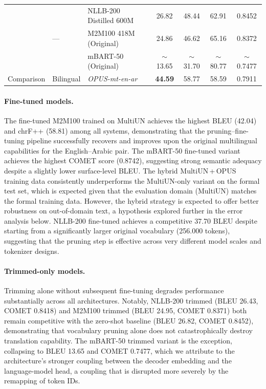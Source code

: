 \documentclass{article}
\newcommand{\best}[1]{\textbf{#1}}
\begin{document}
\begin{table}[h]
\begin{tabular}{@{} l l l
				S[table-format=2.2]
				S[table-format=2.2]
				S[table-format=2.2]
				S[table-format=1.4] @{} }
			& 
			& NLLB-200 Distilled 600M & 26.82 & 48.44 & 62.91 & 0.8452 \\
			& & M2M100 418M (Original)  & 24.86 & 46.62 & 65.16 & 0.8372 \\
			& & mBART-50 (Original)     & {$\sim$13.65} & {$\sim$31.70} & {$\sim$80.77} & {$\sim$0.7477} \\
			\midrule
			
			Comparison & Bilingual & \textit{OPUS-mt-en-ar} & {\best{44.59}} & 58.77 & 58.59 & 0.7911 \\
			\bottomrule
		\end{tabular}
	\end{table}
	
	\paragraph{Fine-tuned models.}
	The fine-tuned M2M100 trained on MultiUN achieves the highest BLEU (42.04) and chrF++
	(58.81) among all systems, demonstrating that the pruning--fine-tuning pipeline successfully
	recovers and improves upon the original multilingual capabilities for the English--Arabic
	pair. The mBART-50 fine-tuned variant achieves the highest COMET score (0.8742),
	suggesting strong semantic adequacy despite a slightly lower surface-level BLEU. The
	hybrid MultiUN\,+\,OPUS training data consistently underperforms the MultiUN-only variant
	on the formal test set, which is expected given that the evaluation domain (MultiUN) matches
	the formal training data. However, the hybrid strategy is expected to offer better
	robustness on out-of-domain text, a hypothesis explored further in the error analysis below.
	NLLB-200 fine-tuned achieves a competitive 37.70 BLEU despite starting from a significantly
	larger original vocabulary (256.000 tokens), suggesting that the pruning step is effective
	across very different model scales and tokenizer designs.
	
	\paragraph{Trimmed-only models.}
	Trimming alone without subsequent fine-tuning degrades performance substantially across all
	architectures. Notably, NLLB-200 trimmed (BLEU 26.43, COMET 0.8418) and M2M100
	trimmed (BLEU 24.95, COMET 0.8371) both remain competitive with the zero-shot baseline
	(BLEU 26.82, COMET 0.8452), demonstrating that vocabulary pruning alone does not
	catastrophically destroy translation capability. The mBART-50 trimmed variant is the
	exception, collapsing to BLEU 13.65 and COMET 0.7477, which we attribute to the
	architecture's stronger coupling between the decoder embedding and the language-model
	head, a coupling that is disrupted more severely by the remapping of token IDs.
	
\end{document}

